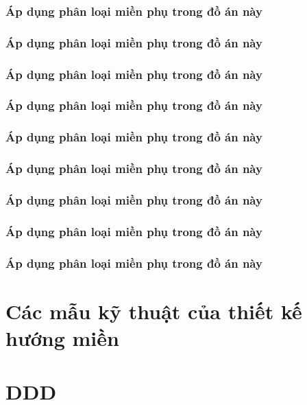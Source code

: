 \subsubsection{Áp dụng phân loại miền phụ trong đồ án này}

\subsubsection{Áp dụng phân loại miền phụ trong đồ án này}

\subsubsection{Áp dụng phân loại miền phụ trong đồ án này}

\subsubsection{Áp dụng phân loại miền phụ trong đồ án này}

\subsubsection{Áp dụng phân loại miền phụ trong đồ án này}

\subsubsection{Áp dụng phân loại miền phụ trong đồ án này}

\subsubsection{Áp dụng phân loại miền phụ trong đồ án này}

\subsubsection{Áp dụng phân loại miền phụ trong đồ án này}

\subsubsection{Áp dụng phân loại miền phụ trong đồ án này}

\section{Các mẫu kỹ thuật của thiết kế hướng miền}

\section{DDD}

